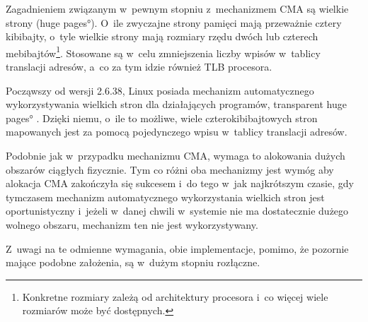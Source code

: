 Zagadnieniem związanym w~pewnym stopniu z~mechanizmem CMA są wielkie
strony (\ang{huge pages}).  O~ile zwyczajne strony pamięci mają
przeważnie cztery kibibajty, o~tyle wielkie strony mają rozmiary rzędu
dwóch lub czterech mebibajtów\footnote{Konkretne rozmiary zależą od
  architektury procesora i~co więcej wiele rozmiarów może być
  dostępnych.}.  Stosowane są w~celu zmniejszenia liczby wpisów
w~tablicy translacji adresów, a~co za tym idzie również TLB procesora.

Począwszy od wersji 2.6.38, Linux posiada mechanizm automatycznego
wykorzystywania wielkich stron dla działających programów,
\ang{transparent huge pages} \autocite{bib:v2.6.38}.  Dzięki niemu,
o~ile to możliwe, wiele czterokibibajtowych stron mapowanych jest za
pomocą pojedynczego wpisu w~tablicy translacji adresów.

Podobnie jak w~przypadku mechanizmu CMA, wymaga to alokowania dużych
obszarów ciągłych fizycznie.  Tym co różni oba mechanizmy jest wymóg
aby alokacja CMA zakończyła się sukcesem i~do tego w~jak najkrótszym
czasie, gdy tymczasem mechanizm automatycznego wykorzystania wielkich
stron jest oportunistyczny i~jeżeli w~danej chwili w~systemie nie ma
dostatecznie dużego wolnego obszaru, mechanizm ten nie jest
wykorzystywany.

Z~uwagi na te odmienne wymagania, obie implementacje, pomimo, że
pozornie mające podobne założenia, są w~dużym stopniu rozłączne.
